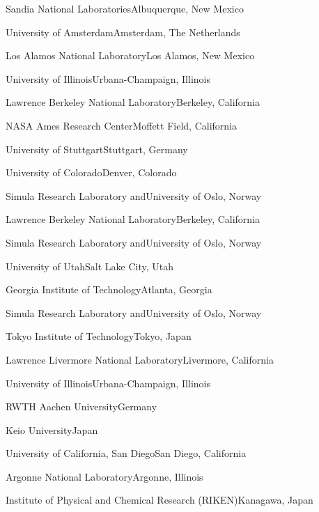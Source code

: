 \begin{multicols}{2}
 {Sandia National
Laboratories}{Albuquerque, New Mexico}

 {University of Amsterdam}{Amsterdam,
The Netherlands}

 {Los Alamos National Laboratory}{Los
Alamos, New Mexico}

 {University of
Illinois}{Urbana-Champaign, Illinois}

 {Lawrence Berkeley National
Laboratory}{Berkeley, California}

 {NASA Ames Research Center}{Moffett Field,
California}

 {University of Stuttgart}{Stuttgart,
Germany}

 {University of Colorado}{Denver, Colorado}

{Simula Research Laboratory and}{University of Oslo, Norway}

 {Lawrence Berkeley National
Laboratory}{Berkeley, California}

{Simula Research Laboratory and}{University of Oslo, Norway}

 {University of Utah}{Salt Lake City, Utah}

 {Georgia Institute of Technology}{Atlanta,
Georgia}

{Simula Research Laboratory and}{University of Oslo, Norway}

 {Tokyo Institute of Technology}{Tokyo,
Japan}

 {Lawrence Livermore National
Laboratory}{Livermore, California}

 {University of Illinois}{Urbana-Champaign,
Illinois}

 {RWTH Aachen University}{Germany}

 {Keio University}{Japan}

 {University of California, San
Diego}{San Diego, California}

 {Argonne National Laboratory}{Argonne,
Illinois}

 {Institute of Physical and Chemical Research
(RIKEN)}{Kanagawa, Japan}


\end{multicols}
